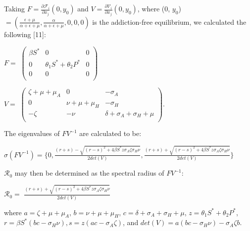 \documentclass[12pt]{article}
\begin{document}
Taking $F=\frac{\partial \mathscr{F}_i}{\partial x_j} (0, y_0)$ and $V=\frac{\partial \mathscr{V}_i}{\partial x_j} (0, y_0)$, where (0, $y_{0}$) $=(\frac{\epsilon + \mu}{\alpha + \epsilon +\mu},\frac{\alpha}{\alpha + \epsilon +\mu},0,0,0)$ is the addiction-free equilibrium, we calculated the following [11]: 



\begin{center}
$F=$
$ \begin{pmatrix}

\beta S^* &  0  & 0 \\
0 & \theta_1 S^* +\theta_2 P^* & 0\\
0  &   0 & 0\\
\end{pmatrix}$



$V=$
$ \begin{pmatrix}

\zeta +\mu +\mu_A &  0  & -\sigma_A \\
0 &  \nu+\mu+\mu_H & -\sigma_H\\
-\zeta& -\nu  & \delta + \sigma_A + \sigma_H + \mu\\

\end{pmatrix}$.
\end{center}

The eigenvalues of $FV^{-1}$ are calculated to be: 
\begin{center}
$\sigma (FV^{-1}) = \{0, \frac{(r+s)-\sqrt{(r-s)^2+4\beta S^* z  \sigma_A \zeta \sigma_H \nu}}{2det(V)} 
, \frac{(r+s)+\sqrt{(r-s)^2+4\beta S^* z  \sigma_A \zeta \sigma_H \nu}}{2det(V)} 
\}$
\end{center}

$\mathscr{R}_0$ may then be determined as the spectral radius of $FV^{-1}$:
\begin{center}
$\mathscr{R}_0=$ $\frac{(r+s)+\sqrt{(r-s)^2+4\beta S^* z  \sigma_A \zeta \sigma_H \nu}}{2det(V)} $
\end{center}
where $a=\zeta +\mu + \mu_A$, $b=\nu + \mu + \mu_H$, $c=\delta + \sigma_A + \sigma_H +\mu$, $z=\theta_1 S^* + \theta_2 P^*$, $ r=\beta S^* (bc-\sigma_H \nu), s=z(ac-\sigma_{A} \zeta)$, and $det(V)=a(bc-\sigma_H\nu)-\sigma_A\zeta b$.
\end{document}
